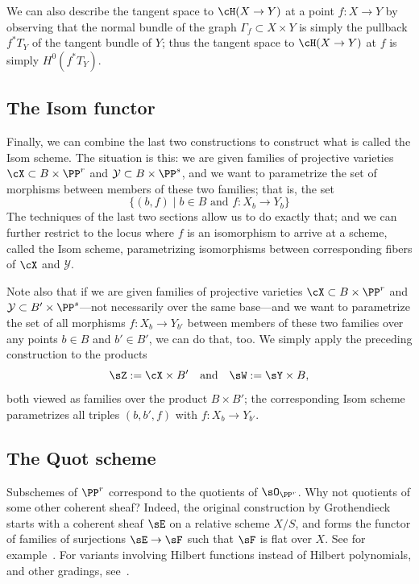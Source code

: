 We can also describe the tangent space to $\cH(X \to Y)$ at a point $f : X \to Y$ by observing that the normal bundle of the graph $\Gamma_f \subset X \times Y$ is simply the pullback $f^*T_Y$ of the tangent bundle of $Y$; thus the tangent space to $\cH(X \to Y)$ at $f$ is simply $H^0(f^*T_Y)$.

\subsection{The Isom functor}\label{Isom}
Finally, we can combine the last two constructions to construct what is called the Isom scheme. The situation is this: we are given families of projective varieties $\cX \subset B \times \PP^r$ and $\mathcal{Y} \subset B\times \PP^s$, and we want to parametrize the set of morphisms between members of these two families; that is, the set
$$
\{ (b, f) \mid b \in B \text{ and } f: X_b \to Y_b \}
$$
The techniques of the last two sections allow us to do exactly that; and we can further restrict to the locus where $f$ is an isomorphism to arrive at a scheme, called the Isom scheme, parametrizing isomorphisms between corresponding fibers of $\cX$ and $\mathcal Y$.

Note also that if we are given families of projective varieties $\cX \subset B \times \PP^r$ and $\mathcal{Y} \subset B' \times \PP^s$---not necessarily over the same base---and we want to parametrize the set of all morphisms $f : X_b \to Y_{b'}$ between members of these two families over any points $b \in B$ and $b' \in B'$, we can do that, too. We simply apply the preceding construction to the products
$$
\sZ := \cX \times B' \quad \text{and} \quad \sW : = \sY \times B,
$$
both viewed as families over the product $B \times B'$; the corresponding Isom scheme parametrizes all triples $(b, b', f)$ with $f : X_b \to Y_{b'}$.

\subsection{The Quot scheme} Subschemes of $\PP^{r}$ correspond to the quotients of $\sO_{\PP^{r}}$. Why not quotients of some other coherent sheaf? Indeed, the original construction by Grothendieck starts with a coherent sheaf $\sE$
on a relative scheme $X/S$, and forms the functor of families of surjections $\sE \to \sF$ such that $\sF$ is flat over $X$. See for example~\cite{MR2222646}.
 For variants involving Hilbert functions instead of Hilbert polynomials, and other gradings, see~\cite{MR2073194}.
 
